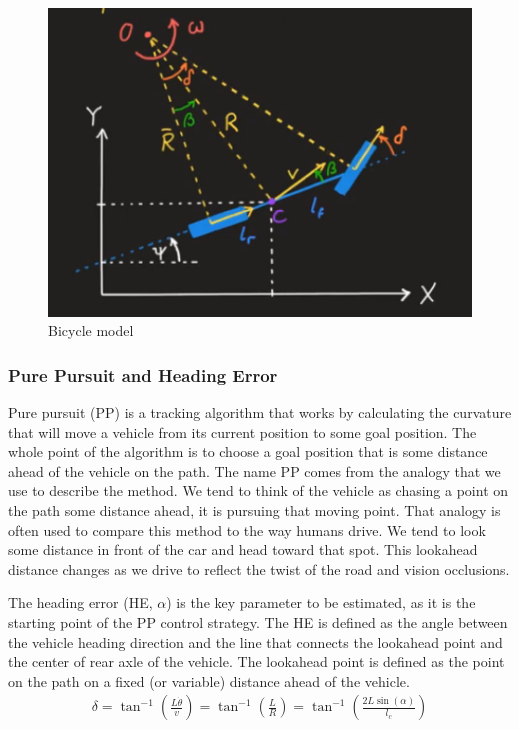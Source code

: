 \documentclass[a4paper,12pt,sort&compress]{article}
\begin{document}
    \begin{figure}
        \centering
        \includegraphics[width=0.8\linewidth]{bicycle_model.png}
        \caption{Bicycle model}
        \label{fig:bicycle_model}
    \end{figure}

    \subsubsection*{Pure Pursuit and Heading Error}
    Pure pursuit (PP) is a tracking algorithm that works by calculating the curvature that will move a vehicle
    from its current position to some goal position. The whole point of the algorithm is to choose a goal
    position that is some distance ahead of the vehicle on the path. The name PP comes from
    the analogy that we use to describe the method. We tend to think of the vehicle as chasing a point
    on the path some distance ahead, it is pursuing that moving point. That analogy is often used
    to compare this method to the way humans drive. We tend to look some distance in front of the car
    and head toward that spot. This lookahead distance changes as we drive to reflect the twist of the
    road and vision occlusions\cite{coulter1992implementation}.

    The heading error (HE, $\alpha$) is the key parameter to be estimated, as it is the
    starting point of the PP control strategy\citep{7796574,purepursuit}.
    The HE is defined as the angle between the vehicle heading direction and the
    line that connects the lookahead point and the center of rear axle of the
    vehicle. The lookahead point is defined as the point on the path on a fixed (or
    variable) distance ahead of the vehicle. 
    \begin{align}
        \delta=\tan^{-1}\left(\frac{L\dot{\theta}}{v}\right)=\tan^{-1}\left(\frac{L}{R}\right)=\tan^{-1}\left(\frac{2L\sin\left(\alpha\right)}{l_{c}}\right)
    \end{align}
\end{document}
